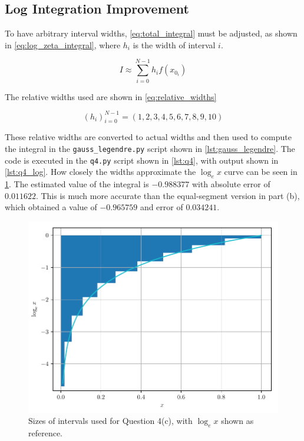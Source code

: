 \documentclass[a4paper,titlepage]{article}
\newcommand{\code}[1]{\texttt{#1}}
\begin{document}
	\subsection{Log Integration Improvement}
	
	To have arbitrary interval widths, \cref{eq:total_integral} must be adjusted, as shown in \cref{eq:log_zeta_integral}, where $h_i$ is the width of interval $i$.
	
	\begin{equation} \label{eq:log_zeta_integral}
		I \approx \sum_{i=0}^{N-1} h_i f(x_{0_i}) 
	\end{equation}
	
	The relative widths used are shown in \cref{eq:relative_widths}
	
	\begin{equation} \label{eq:relative_widths}
		(h_i)_{i=0}^{N-1} = (1, 2, 3, 4, 5, 6, 7, 8, 9, 10)
	\end{equation}
	

	These relative widths are converted to actual widths and then used to compute the integral in the \code{gauss\_legendre.py} script shown in \cref{lst:gauss_legendre}. The code is executed in the \code{q4.py} script shown in \cref{lst:q4}, with output shown in \cref{lst:q4_log}.	How closely the widths approximate the $\log_e x$ curve can be seen in \cref{fig:q4c}. The estimated value of the integral is $-0.988377$ with absolute error of $0.011622$. This is much more accurate than the equal-segment version in part (b), which obtained a value of $-0.965759$ and error of $0.034241$.
	
	\begin{figure}[!htb]
		\centering
		\includegraphics[width=\columnwidth]{plots/q4c.pdf}
		\caption
		{Sizes of intervals used for Question 4(c), with $\log_e x$ shown as reference.}
		\label{fig:q4c}
	\end{figure}
\end{document}
